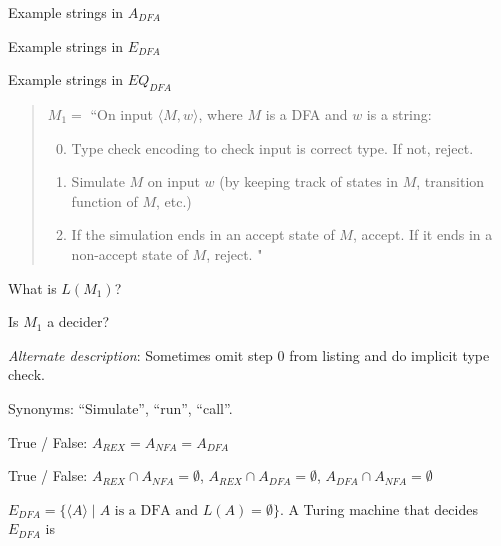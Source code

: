 \documentclass[12pt, oneside]{article}
\begin{document}
    Example strings in $A_{DFA}$
    
    \vfill
    
    Example strings in  $E_{DFA}$
    
    \vfill
    
    Example strings in  $EQ_{DFA}$
    
    \vfill

    \begin{quote}
      $M_1 = $ ``On input $\langle M,w\rangle$, where $M$ is a DFA and $w$ is a string:
      \begin{enumerate}
      \setcounter{enumi}{-1}
      \item Type check encoding to check input is correct type. If not, reject.
      \item Simulate $M$ on input $w$ (by keeping track of states in $M$, transition function of $M$, etc.) 
      \item If the simulation ends in an accept state of $M$, accept. If it ends in a non-accept state of $M$, reject. "
      \end{enumerate}
      \end{quote}
      
    
    What is $L(M_1)$? 
    
    \vfill
    
    Is $M_1$ a decider?
    
    \vfill
    
    
    {\it Alternate description}:
    Sometimes omit step 0 from listing and do implicit type check.
    
    Synonyms: ``Simulate'', ``run'', ``call''.
    
    \newpage
    
      True / False: $A_{REX} = A_{NFA} = A_{DFA}$
    
      True / False: $A_{REX} \cap A_{NFA} = \emptyset$, $A_{REX} \cap A_{DFA} = \emptyset$, $A_{DFA} \cap A_{NFA} = \emptyset$
    
      
      \vfill
    
      $E_{DFA} = \{ \langle A \rangle \mid  \text{$A$ is a  DFA and  $L(A) = \emptyset$}\}$. 
        A Turing machine that  decides $E_{DFA}$ is
    
\end{document}
